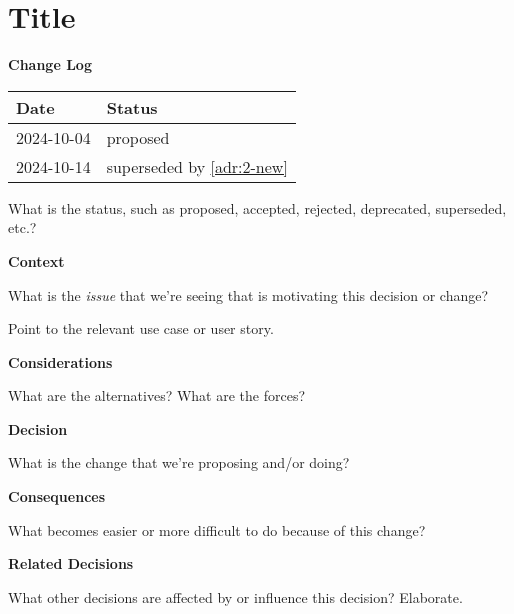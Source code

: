 \section{Title}
\label{adr:1-short}

\textbf{Change Log}

\begin{tabular}{|l|l|}
    \hline
    \textbf{Date} & \textbf{Status} \\
    \hline
    2024-10-04 & proposed \\
    \hline
    2024-10-14 & superseded by \ref{adr:2-new} \\
    \hline
\end{tabular}

What is the status, such as proposed, accepted, rejected, deprecated, superseded, etc.?

\textbf{Context}

What is the \emph{issue} that we're seeing that is motivating this decision or change?

Point to the relevant use case or user story.

\textbf{Considerations}

What are the alternatives? What are the forces?

\textbf{Decision}

What is the change that we're proposing and/or doing?

\textbf{Consequences}

What becomes easier or more difficult to do because of this change?

\textbf{Related Decisions}

What other decisions are affected by or influence this decision? Elaborate.
